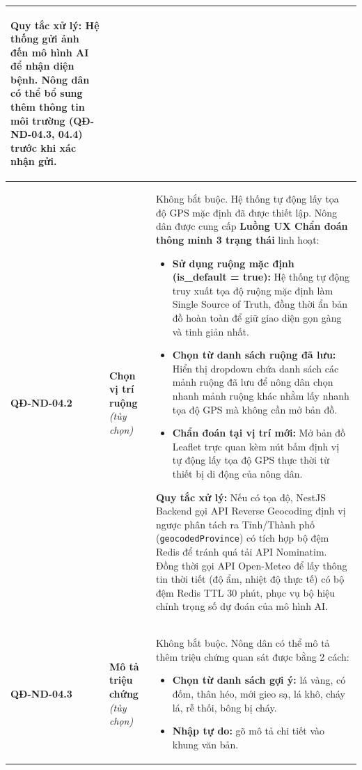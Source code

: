 \documentclass[12pt,a4paper]{article}
\begin{document}
\begin{longtable}{|
        >{\raggedright\arraybackslash}p{2.2cm}|
        >{\raggedright\arraybackslash}p{2.8cm}|
        >{\raggedright\arraybackslash}p{9.8cm}|}
\begin{itemize}[leftmargin=*,topsep=2pt,itemsep=1pt]
    \end{itemize}
    \textbf{Quy tắc xử lý:} Hệ thống gửi ảnh đến mô hình AI để nhận diện bệnh. Nông dân có thể bổ sung thêm thông tin môi trường (QĐ-ND-04.3, 04.4) trước khi xác nhận gửi.                                                                                                                                                                                                              \\
    \hline
    \textbf{QĐ-ND-04.2}  & \textbf{Chọn vị trí ruộng} \textit{(tùy chọn)} &
    Không bắt buộc. Hệ thống tự động lấy tọa độ GPS mặc định đã được thiết lập. Nông dân được cung cấp \textbf{Luồng UX Chẩn đoán thông minh 3 trạng thái} linh hoạt:
    \begin{itemize}[leftmargin=*,topsep=2pt,itemsep=1pt]
        \item \textbf{Sử dụng ruộng mặc định (is\_default = true):} Hệ thống tự động truy xuất tọa độ ruộng mặc định làm Single Source of Truth, đồng thời ẩn bản đồ hoàn toàn để giữ giao diện gọn gàng và tinh giản nhất.
        \item \textbf{Chọn từ danh sách ruộng đã lưu:} Hiển thị dropdown chứa danh sách các mảnh ruộng đã lưu để nông dân chọn nhanh mảnh ruộng khác nhằm lấy nhanh tọa độ GPS mà không cần mở bản đồ.
        \item \textbf{Chẩn đoán tại vị trí mới:} Mở bản đồ Leaflet trực quan kèm nút bấm định vị tự động lấy tọa độ GPS thực thời từ thiết bị di động của nông dân.
    \end{itemize}
    \textbf{Quy tắc xử lý:} Nếu có tọa độ, NestJS Backend gọi API Reverse Geocoding định vị ngược phân tách ra Tỉnh/Thành phố (\texttt{geocodedProvince}) có tích hợp bộ đệm Redis để tránh quá tải API Nominatim. Đồng thời gọi API Open-Meteo để lấy thông tin thời tiết (độ ẩm, nhiệt độ thực tế) có bộ đệm Redis TTL 30 phút, phục vụ bộ hiệu chỉnh trọng số dự đoán của mô hình AI. \\
    \hline
    \textbf{QĐ-ND-04.3}  & \textbf{Mô tả triệu chứng} \textit{(tùy chọn)} &
    Không bắt buộc. Nông dân có thể mô tả thêm triệu chứng quan sát được bằng 2 cách:
    \begin{itemize}[leftmargin=*,topsep=2pt,itemsep=1pt]
        \item \textbf{Chọn từ danh sách gợi ý:} lá vàng, có đốm, thân héo, mới gieo sạ, lá khô, cháy lá, rễ thối, bông bị cháy.
        \item \textbf{Nhập tự do:} gõ mô tả chi tiết vào khung văn bản.
    \end{itemize}

\end{longtable}
\end{document}
